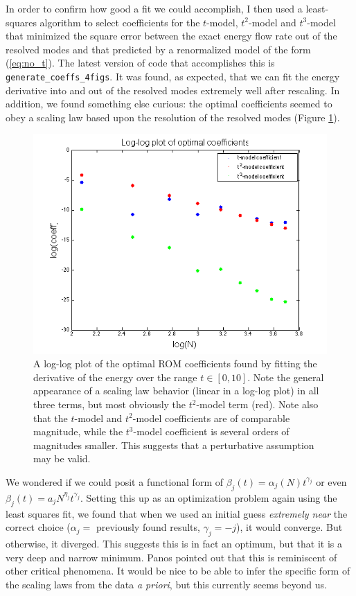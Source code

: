 \documentclass{article}
\begin{document}
In order to confirm how good a fit we could accomplish, I then used a least-squares algorithm to select coefficients for the $t$-model, $t^2$-model and $t^3$-model that minimized the square error between the exact energy flow rate out of the resolved modes and that predicted by a renormalized model of the form (\ref{eq:no_t}). The latest version of code that accomplishes this is \verb!generate_coeffs_4figs!. It was found, as expected, that we can fit the energy derivative into and out of the resolved modes extremely well after rescaling. In addition, we found something else curious: the optimal coefficients seemed to obey a scaling law based upon the resolution of the resolved modes (Figure \ref{fig:loglog_1}).

\begin{figure}[h]
\includegraphics[width=\textwidth]{loglog_1.png}
\caption{A log-log plot of the optimal ROM coefficients found by fitting the derivative of the energy over the range $t\in[0,10]$. Note the general appearance of a scaling law behavior (linear in a log-log plot) in all three terms, but most obviously the $t^2$-model term (red). Note also that the $t$-model and $t^2$-model coefficients are of comparable magnitude, while the $t^3$-model coefficient is several orders of magnitudes smaller. This suggests that a perturbative assumption may be valid.}\label{fig:loglog_1}
\end{figure}

We wondered if we could posit a functional form of $\beta_j(t) = \alpha_j(N) t^{\gamma_j}$ or even $\beta_j(t) = a_j N^{\eta_j}t^{\gamma_j}$. Setting this up as an optimization problem again using the least squares fit, we found that when we used an initial guess \emph{extremely near} the correct choice ($\alpha_j=$ previously found results, $\gamma_j = -j$), it would converge. But otherwise, it diverged. This suggests this is in fact an optimum, but that it is a very deep and narrow minimum. Panos pointed out that this is reminiscent of other critical phenomena. It would be nice to be able to infer the specific form of the scaling laws from the data \emph{a priori}, but this currently seems beyond us.
\end{document}
